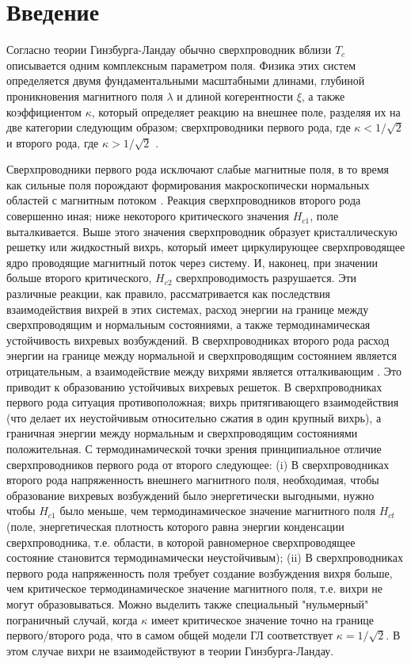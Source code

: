 \chapter{Введение}

Согласно теории Гинзбурга-Ландау обычно сверхпроводник вблизи \( T_c \) 
описывается одним комплексным параметром поля. Физика этих систем определяется 
двумя фундаментальными масштабными длинами, глубиной проникновения магнитного 
поля \( \lambda \) и длиной когерентности \( \xi \), а также коэффициентом 
\( \kappa \), который определяет реакцию на внешнее поле, разделяя их на две  
категории следующим образом; сверхпроводники первого рода, где 
\( \kappa < 1/\sqrt{2} \) и второго рода, где \( \kappa > 1/\sqrt{2} \) 
\cite{bib:3}.

Сверхпроводники первого рода исключают слабые магнитные поля, в то время как 
сильные поля порождают формирования макроскопически нормальных областей с 
магнитным потоком \cite{bib:4}. Реакция сверхпроводников второго рода 
совершенно иная; ниже некоторого критического значения \( H_{c1} \), поле 
выталкивается. Выше этого значения сверхпроводник образует кристаллическую 
решетку или жидкостный вихрь, который имеет циркулирующее сверхпроводящее 
ядро проводящие магнитный поток через систему. И, наконец, при значении 
больше второго критического, \( H_{c2} \) сверхпроводимость разрушается. Эти 
различные реакции, как правило, рассматривается как последствия взаимодействия 
вихрей в этих системах, расход энергии на границе между сверхпроводящим и 
нормальным состояниями, а также термодинамическая устойчивость вихревых 
возбуждений. В сверхпроводниках второго рода расход энергии на границе между 
нормальной и сверхпроводящим состоянием является отрицательным, а 
взаимодействие между вихрями является отталкивающим \cite{bib:3}. Это приводит 
к образованию устойчивых вихревых решеток. В сверхпроводниках первого рода 
ситуация противоположная; вихрь притягивающего взаимодействия (что делает их 
неустойчивым относительно сжатия в один крупный вихрь), а граничная энергии 
между нормальным и сверхпроводящим состояниями положительная. С 
термодинамической точки зрения принципиальное отличие сверхпроводников первого 
рода от второго следующее: (i) В сверхпроводниках второго рода напряженность 
внешнего магнитного поля, необходимая, чтобы образование вихревых возбуждений 
было энергетически выгодными, нужно чтобы \( H_{c1} \) было меньше, чем 
термодинамическое значение магнитного поля \( H_{ct} \) (поле, энергетическая
плотность которого равна энергии конденсации сверхпроводника, т.е. области, в 
которой равномерное сверхпроводящее состояние становится термодинамически 
неустойчивым); (ii) В сверхпроводниках первого рода напряженность поля требует 
создание возбуждения вихря больше, чем критическое термодинамическое значение 
магнитного поля, т.е. вихри не могут образовываться. Можно выделить также 
специальный "нульмерный" пограничный случай, когда \( \kappa \) имеет 
критическое значение точно на границе первого/второго рода, что в самом общей 
модели ГЛ соответствует \( \kappa = 1/\sqrt{2} \). В этом случае вихри не 
взаимодействуют в теории Гинзбурга-Ландау.

